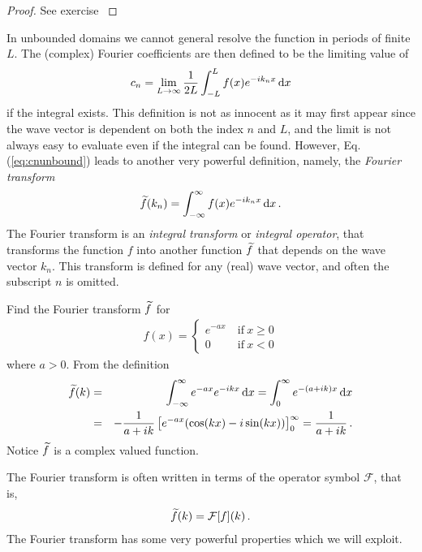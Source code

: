 \begin{proof}
	See exercise \label{missingproof}
\end{proof}

In unbounded domains we cannot general resolve the function in periods of finite $L$. The (complex) Fourier
coefficients are then defined to be the limiting value of
\begin{eqnarray}
	\label{eq:cnunbound}
	c_n = \lim_{L\rightarrow \infty} \frac{1}{2L} \int_{-L}^L f(x) e^{-ik_n x}
	\, \mathrm{d} x  
\end{eqnarray}
if the integral exists. This definition is not as innocent as it may first appear since the wave vector is dependent on 
both the index $n$ and $L$, and the limit is not always easy to evaluate even if the integral can be found. 
However, Eq. (\ref{eq:cnunbound}) leads to another very powerful definition, namely, the \emph{Fourier transform}
\begin{eqnarray}
	\widetilde{f}(k_n) = \int_{-\infty}^\infty  f(x) e^{-ik_n x} \, \mathrm{d} x \, .
\end{eqnarray}
The Fourier transform is an \emph{integral transform} or \emph{integral operator}, that transforms the function $f$ into 
another function $\widetilde{f}$ that depends on the wave vector $k_n$. This transform is defined for any (real) 
wave vector, and often the subscript $n$ is omitted. 

\begin{example}
	Find the Fourier transform $\widetilde{f}$ for 
	\begin{eqnarray}
		f(x) = \left\{
			\begin{array}{ll}
				e^{-a x} & \ \text{if} \ x \geq 0 \\
				0 & \ \text{if} \ x < 0
			\end{array}
		\right.
	\end{eqnarray}
	where $a > 0$. From the definition
	\begin{eqnarray}
		\widetilde{f}(k) &=& \int_{-\infty}^\infty e^{-ax}  e^{-ik x} \, \mathrm{d} x = \int_0^\infty e^{-(a+ik)x}\, \mathrm{d} x 
		\nonumber \\
		&=& - \frac{1}{a+ik} \left[e^{-ax}(\cos(kx) - i\sin(kx))\right]_{0}^\infty = \frac{1}{a+ik} \, .
	\end{eqnarray}
	Notice $\widetilde{f}$ is a complex valued function. 
\end{example}	

\noindent The Fourier transform is often written in terms of the operator symbol $\mathcal{F}$, that is, 
\begin{eqnarray}
	\widetilde{f}(k) = \mathcal{F}[f](k) \, .
\end{eqnarray}
The Fourier transform has some very powerful properties which we will exploit.  

